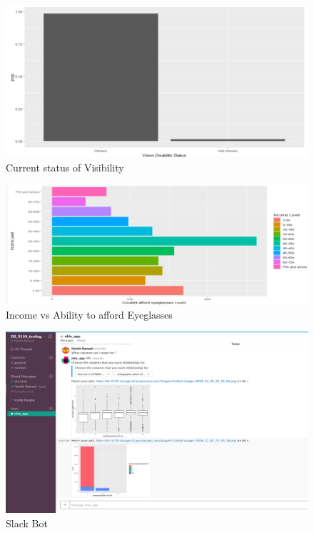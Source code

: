 \documentclass[12pt]{article}
\begin{document}
\begin{figure}[H]
\centering
\includegraphics[scale=0.5]{visibility.png}
\caption{Current status of Visibility}
\label{fig:visibility}
\end{figure}

\begin{figure}[H]
\centering
\includegraphics[scale=0.5]{eyeglass.png}
\caption{Income vs Ability to afford Eyeglasses}
\label{fig:eyeglass}
\end{figure}

\begin{figure}[H]
\centering
\includegraphics[scale=0.75]{slackbot.png}
\caption{Slack Bot}
\label{fig:slack}
\end{figure}
\end{document}

